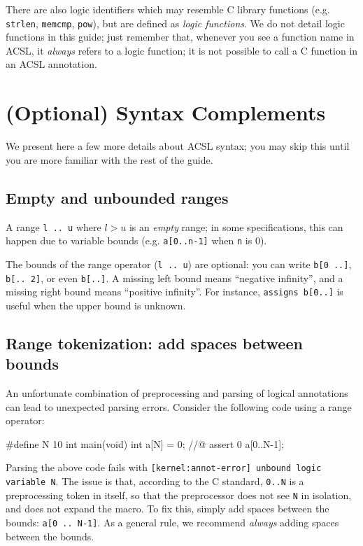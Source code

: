 \documentclass{frama-c-book}
\begin{document}
There are also logic identifiers which may resemble C library functions
(e.g. \texttt{strlen}, \texttt{memcmp}, \texttt{pow}), but are defined
as {\em logic functions}. We do not detail logic functions in this guide;
just remember that, whenever you see a function name in ACSL,
it {\em always} refers to a logic function; it is not possible to call
a C function in an ACSL annotation.

\section{(Optional) Syntax Complements}
\label{sec:acsl-guide-complements}

We present here a few more details about ACSL syntax; you may skip this until
you are more familiar with the rest of the guide.

\subsection*{Empty and unbounded ranges}

A range \texttt{l .. u} where $l > u$ is an {\em empty} range; in some
specifications, this can happen due to variable bounds
(e.g. \texttt{a[0..n-1]} when \texttt{n} is 0).

The bounds of the range operator (\texttt{l .. u}) are optional: you can write
\texttt{b[0 ..]}, \texttt{b[.. 2]}, or even \texttt{b[..]}. A missing left
bound means ``negative infinity'', and a missing right bound means
``positive infinity''. For instance, \texttt{assigns b[0..]} is useful when
the upper bound is unknown.

\subsection*{Range tokenization: add spaces between bounds}

An unfortunate combination of preprocessing and parsing of logical annotations
can lead to unexpected parsing errors. Consider the following code using
a range operator:

\begin{listing-nonumber}
#define N 10
int main(void) {
  int a[N] = {0};
  //@ assert 0 \in a[0..N-1];
}
\end{listing-nonumber}

Parsing the above code fails with
\texttt{[kernel:annot-error] unbound logic variable N}.
The issue is that, according to the C standard, \texttt{0..N} is a preprocessing token
in itself, so that the preprocessor does not see \texttt{N} in isolation, and does not expand
the macro. To fix this, simply add spaces between the bounds:
\texttt{a[0 .. N-1]}.
As a general rule, we recommend {\em always} adding spaces between the bounds.
\end{document}

